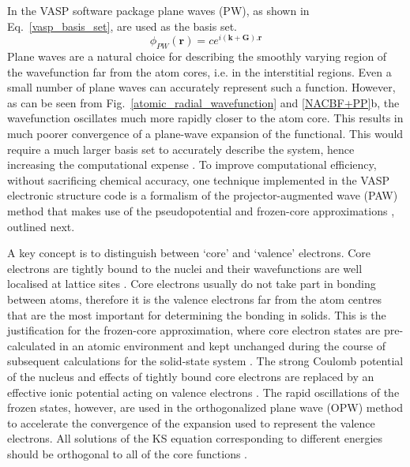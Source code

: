 \documentclass[11pt, twoside]{report}
\begin{document}
In the VASP software package \cite{VASP} plane waves (PW), as shown in Eq.~\ref{vasp_basis_set}, are used as the basis set. 
\begin{equation}\label{vasp_basis_set}
\phi_{PW}(\mathbf{r}) = ce^{i(\mathbf{k}+\mathbf{G}).\mathbf{r}}
\end{equation}
Plane waves are a natural choice for describing the smoothly varying region of the wavefunction far from the atom cores, i.e. in the interstitial regions. Even a small number of plane waves can accurately represent such a function. However, as can be seen from Fig.~\ref{atomic_radial_wavefunction} and \ref{NACBF+PP}b, the wavefunction oscillates much more rapidly closer to the atom core. This results in much poorer convergence of a plane-wave expansion of the functional. This would require a much larger basis set to accurately describe the system, hence increasing the computational expense \cite{Prasad_ch5}. To improve computational efficiency, without sacrificing chemical accuracy, one technique implemented in the VASP electronic structure code is a formalism of the projector-augmented wave (PAW) method \cite{PAW} that makes use of the pseudopotential and frozen-core approximations \cite{PAW_VASP}, outlined next.

A key concept is to distinguish between `core' and `valence' electrons. Core electrons are tightly bound to the nuclei and their wavefunctions are well localised at lattice sites \cite{Prasad_ch5}. Core electrons usually do not take part in bonding between atoms, therefore it is the valence electrons far from the atom centres that are the most important for determining the bonding in solids. This is the justification for the frozen-core approximation, where core electron states are pre-calculated in an atomic environment and kept unchanged during the course of subsequent calculations for the solid-state system \cite{vasp_slides_PP1}. The strong Coulomb potential of the nucleus and effects of tightly bound core electrons are replaced by an effective ionic potential acting on valence electrons \cite{RichardMartin_Ch11}. The rapid oscillations of the frozen states, however, are used in the orthogonalized plane wave (OPW) method to accelerate the convergence of the expansion used to represent the valence electrons. All solutions of the KS equation corresponding to different energies should be orthogonal to all of the core functions \cite{Prasad_ch5}.
\end{document}
